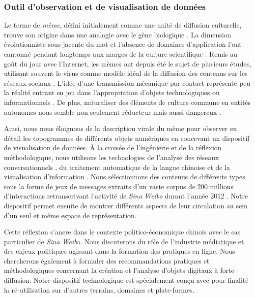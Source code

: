 \subsubsection{Outil d'observation et de visualisation de données}

Le terme de \textit{mème}, défini initialement comme une unité de diffusion culturelle, trouve son origine dans une analogie avec le gène biologique \citep{Dawkins1989, Blackmore2001}. La dimension évolutionniste sous-jacente du mot et l'absence de domaines d'application l'ont cantonné pendant longtemps aux marges de la culture scientifique \citep{Jouxtel2014}. Remis au goût du jour avec l'Internet, les mèmes ont depuis été le sujet de plusieurs études, utilisant souvent le virus comme modèle idéal de la diffusion des contenus sur les réseaux sociaux \citep{Leskovec2005, Adamic2014}. L'idée d'une transmission mécanique par contact représente peu la réalité entrant en jeu dans l'appropriation d'objets technologiques \citep{Orlikowski1993} ou informationnels \citep{Certeau1980}. De plus, naturaliser des éléments de culture commune en entités autonomes nous semble non seulement réducteur mais aussi dangereux \citep{Elias1975}.

Ainsi, nous nous éloignons de la description virale du mème pour observer en détail les topogrammes de différents objets numériques en concevant un dispositif de visualisation de données. À la croisée de l'ingénierie et de la réflexion méthodologique, nous utilisons les technologies de l'analyse des réseaux conversationnels \citep{Weng2012}, du traitement automatique de la langue chinoise \citep{Xue2003} et de la visualisation d'information \citep{Cairo2012}. Nous sélectionnons des contenus de différents types sous la forme de jeux de messages extraits d'un vaste corpus de 200 millions d'interactions retranscrivant l'activité de \textit{Sina Weibo} durant l'année 2012 \citep{Fu2013}. Notre dispositif permet ensuite de montrer différents aspects de leur circulation au sein d'un seul et même espace de représentation.

Cette réflexion s'ancre dans le contexte politico-économique chinois avec le cas particulier de \textit{Sina Weibo}. Nous discuterons du rôle de l'industrie médiatique et des enjeux politiques agissant dans la formation des pratiques en ligne. Nous chercherons également à formuler des recommandations pratiques et méthodologiques concernant la création et l'analyse d'objets digitaux à forte diffusion. Notre dispositif technologique est spécialement conçu avec pour finalité la ré-utilisation sur d'autres terrains, domaines et plate-formes.


